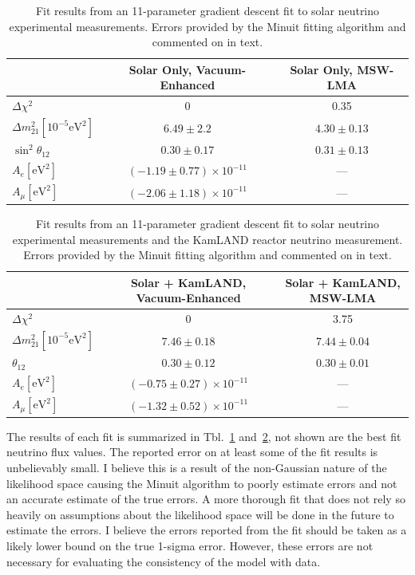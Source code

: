 \begin{table}
    \centering
    \begin{tabular}{l|c|c}
        & Solar Only, Vacuum-Enhanced& Solar Only, MSW-LMA\\
        \hline
        $\Delta \chi^{2}$ & 0 & 0.35\\
        $\Delta m^{2}_{21} [10^{-5}\mathrm{eV}^{2}]$ & $6.49\pm 2.2$ & $4.30\pm0.13$\\
        $\sin^{2}\theta_{12}$& $0.30\pm0.17$ & $0.31\pm 0.13$\\
        $A_{e}[\mathrm{eV}^{2}]$ & $(-1.19\pm 0.77)\times 10^{-11}$ & ---\\
        $A_{\mu}[\mathrm{eV}^{2}]$ & $(-2.06\pm 1.18)\times10^{-11}$ & --- \\
\end{tabular}
    \caption[Solar Only Gradient Descent Fit Results]{Fit results from
    an 11-parameter gradient descent fit to solar neutrino experimental
    measurements. Errors provided by the Minuit fitting algorithm and
    commented on in text.}
\label{tbl:cham_fit_results1}
\end{table}
\begin{table}
    \centering
    \begin{tabular}{l|c|c}
        & Solar + KamLAND, Vacuum-Enhanced & Solar + KamLAND, MSW-LMA\\
        \hline
        $\Delta \chi^{2}$ & 0 &3.75\\
        $\Delta m^{2}_{21} [10^{-5}\mathrm{eV}^{2}]$ & $7.46\pm0.18$ & $7.44\pm0.04$\\
        $\theta_{12}$ & $0.30 \pm 0.12$ & $0.30\pm 0.01$\\
        $A_{e}[\mathrm{eV}^{2}]$ & $(-0.75\pm 0.27)\times 10^{-11}$ & ---\\
        $A_{\mu}[\mathrm{eV}^{2}]$ & $(-1.32\pm 0.52)\times10^{-11}$ & --- \\
\end{tabular}
    \caption[Solar + KamLAND Gradient Descent Fit Results]{Fit results from
    an 11-parameter gradient descent fit to solar neutrino experimental
    measurements and the KamLAND reactor neutrino measurement.
    Errors provided by the Minuit fitting algorithm and
    commented on in text.}
\label{tbl:cham_fit_results2}
\end{table}

The results of each fit is summarized in Tbl.~\ref{tbl:cham_fit_results1}
and~\ref{tbl:cham_fit_results2}, not shown are the best fit neutrino flux values.
The reported error on at least some of the fit results is unbelievably
small.
I believe this is a result of the non-Gaussian nature of the likelihood
space causing the Minuit algorithm to poorly estimate errors and
not an accurate estimate of the true errors.
A more thorough fit that does not rely so heavily on assumptions about the
likelihood space  will be done in the future to estimate the errors.
I believe the errors reported from the fit should be taken as a likely
lower bound on the true 1-sigma error.
However, these errors are not necessary for evaluating
the consistency of the model with data.

